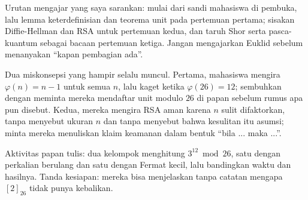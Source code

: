 \begin{untukdosen}
Urutan mengajar yang saya sarankan: mulai dari sandi mahasiswa di pembuka, lalu lemma
keterdefinisian dan teorema unit pada pertemuan pertama; sisakan Diffie-Hellman dan RSA untuk
pertemuan kedua, dan taruh Shor serta pasca-kuantum sebagai bacaan pertemuan ketiga. Jangan
mengajarkan Euklid sebelum menanyakan ``kapan pembagian ada''.

Dua miskonsepsi yang hampir selalu muncul. Pertama, mahasiswa mengira $\varphi(n)=n-1$ untuk
semua $n$, lalu kaget ketika $\varphi(26)=12$; sembuhkan dengan meminta mereka mendaftar unit
modulo $26$ di papan sebelum rumus apa pun disebut. Kedua, mereka mengira RSA aman karena $n$
sulit difaktorkan, tanpa menyebut ukuran $n$ dan tanpa menyebut bahwa kesulitan itu asumsi;
minta mereka menuliskan klaim keamanan dalam bentuk ``bila ... maka ...''.

Aktivitas papan tulis: dua kelompok menghitung $3^{12}\bmod26$, satu dengan perkalian berulang
dan satu dengan Fermat kecil, lalu bandingkan waktu dan hasilnya. Tanda kesiapan: mereka bisa
menjelaskan tanpa catatan mengapa $[2]_{26}$ tidak punya kebalikan.
\end{untukdosen}

